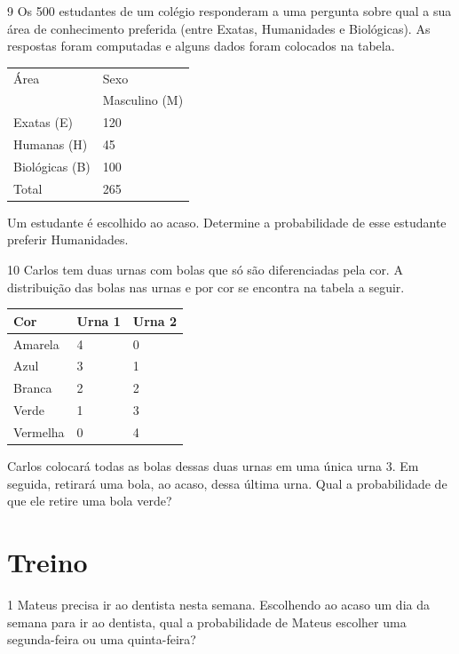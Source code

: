 \pagebreak
\num{9} Os 500 estudantes de um colégio responderam a uma pergunta sobre
qual a sua área de conhecimento preferida (entre Exatas, Humanidades e
Biológicas). As respostas foram computadas e alguns dados foram colocados
na tabela.

\begin{longtable}[]{@{}ll@{}}
\toprule
Área & Sexo\tabularnewline
& Masculino (M)\tabularnewline
Exatas (E) & 120\tabularnewline
Humanas (H) & 45\tabularnewline
Biológicas (B) & 100\tabularnewline
Total & 265\tabularnewline
\bottomrule
\end{longtable}

Um estudante é escolhido ao acaso. Determine a probabilidade de esse
estudante preferir Humanidades.

\vspace{2cm}

\num{10} Carlos tem duas urnas com bolas que só são diferenciadas pela
cor. A distribuição das bolas nas urnas e por cor se encontra na tabela
a seguir.

\begin{longtable}[]{@{}lll@{}}
\toprule
Cor & Urna 1 & Urna 2\tabularnewline
\midrule
\endhead
Amarela & 4 & 0\tabularnewline
Azul & 3 & 1\tabularnewline
Branca & 2 & 2\tabularnewline
Verde & 1 & 3\tabularnewline
Vermelha & 0 & 4\tabularnewline
\bottomrule
\end{longtable}

Carlos colocará todas as bolas dessas duas urnas em uma única urna 3. Em
seguida, retirará uma bola, ao acaso, dessa última urna. Qual a
probabilidade de que ele retire uma bola verde?


\pagebreak
\section{Treino}

\num{1} Mateus precisa ir ao dentista nesta semana. Escolhendo ao acaso um
dia da semana para ir ao dentista, qual a probabilidade de Mateus
escolher uma segunda-feira ou uma quinta-feira?

